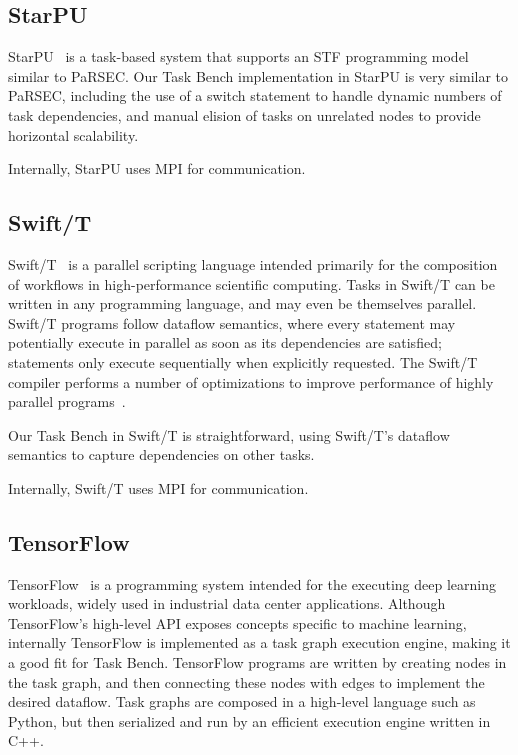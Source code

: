 \subsection{StarPU}

StarPU~\cite{StarPU11} is a task-based system that supports an STF
programming model similar to PaRSEC. Our Task Bench implementation in
StarPU is very similar to PaRSEC, including the use of a switch
statement to handle dynamic numbers of task dependencies, and manual
elision of tasks on unrelated nodes to provide horizontal scalability.

Internally, StarPU uses MPI for communication.

\subsection{Swift/T}

Swift/T~\cite{Wozniak13} is a parallel scripting language intended
primarily for the composition of workflows in high-performance
scientific computing. Tasks in Swift/T can be written in any
programming language, and may even be themselves parallel. Swift/T
programs follow dataflow semantics, where every statement may
potentially execute in parallel as soon as its dependencies are
satisfied; statements only execute sequentially when explicitly
requested. The Swift/T compiler performs a number of optimizations to
improve performance of highly parallel programs~\cite{Armstrong14}.

Our Task Bench in Swift/T is straightforward, using Swift/T's dataflow
semantics to capture dependencies on other tasks.

Internally, Swift/T uses MPI for communication.

\subsection{TensorFlow}

TensorFlow~\cite{TensorFlow15} is a programming system intended for
the executing deep learning workloads, widely used in industrial data
center applications. Although TensorFlow's high-level API exposes
concepts specific to machine learning, internally TensorFlow is
implemented as a task graph execution engine, making it a good fit for
Task Bench. TensorFlow programs are written by creating nodes in the
task graph, and then connecting these nodes with edges to implement
the desired dataflow. Task graphs are composed in a high-level
language such as Python, but then serialized and run by an efficient
execution engine written in C++.

